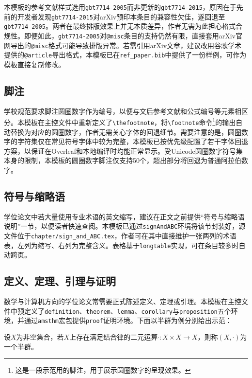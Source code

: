 本模板的参考文献样式选用\verb|gbt7714-2005|而非更新的\verb|gbt7714-2015|，原因在于先前的开发者发现\verb|gbt7714-2015|对arXiv预印本条目的兼容性欠佳，遂回退至\verb|gbt7714-2005|。两者在最终排版效果上并无本质差异，作者无需为此担心格式合规性。即便如此，\verb|gbt7714-2005|对\verb|@misc|条目的支持仍然有限，直接套用arXiv官网导出的\verb|@misc|格式可能导致排版异常。若需引用arXiv文章，建议改用谷歌学术提供的\verb|@article|导出格式，本模板已在\verb|ref_paper.bib|中提供了一份样例，可作为模板直接复制修改。

\subsection{脚注}

学校规范要求脚注圆圈数字作为编号，以便与文后参考文献和公式编号等元素相区分。本模板在主控文件中重新定义了\verb|\thefootnote|，将\verb|\footnote|命令\footnote{这是一段示范用的脚注，用于展示圆圈数字的呈现效果。}的输出自动替换为对应的圆圈数字，作者无需关心字体的回退细节。需要注意的是，圆圈数字的字符集仅在常见符号字体中较为完整，本模板已按优先级配置了若干字体回退方案，以保证在Overleaf和本地编译时均能正常显示。受Unicode圆圈数字符号集本身的限制，本模板的圆圈数字脚注仅支持50个，超出部分将回退为普通阿拉伯数字。

\subsection{符号与缩略语}

学位论文中若大量使用专业术语的英文缩写，建议在正文之前提供“符号与缩略语说明”一节，以便读者快速查阅。本模板已通过\verb|signAndABC|环境将该节封装好，源文件位于\texttt{chapter/sign\_and\_ABC.tex}，作者可在其中直接维护一张两列的术语表，左列为缩写、右列为完整含义。表格基于\verb|longtable|实现，可在条目较多时自动跨页。

\subsection{定义、定理、引理与证明}

数学与计算机方向的学位论文常需要正式陈述定义、定理或引理。本模板在主控文件中预定义了\verb|definition|、\verb|theorem|、\verb|lemma|、\verb|corollary|与\verb|proposition|五个环境，并通过\verb|amsthm|宏包提供\verb|proof|证明环境。下面以半群为例分别给出示范：

\begin{definition}
    设$X$为非空集合，若$X$上存在满足结合律的二元运算$\cdot:X\times X\to X$，则称$(X,\cdot)$为一个半群。
\end{definition}

